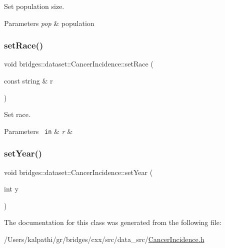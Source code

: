 Set population size. 


\begin{DoxyParams}{Parameters}
{\em pop} & population \\
\hline
\end{DoxyParams}
\mbox{\label{classbridges_1_1dataset_1_1_cancer_incidence_ac19844df029b7dc4595205e9660d53e2}} 
\subsubsection{\texorpdfstring{setRace()}{setRace()}}
{\footnotesize\ttfamily void bridges\+::dataset\+::\+Cancer\+Incidence\+::set\+Race (\begin{DoxyParamCaption}\item[{const string \&}]{r }\end{DoxyParamCaption})\hspace{0.3cm}{\ttfamily [inline]}}



Set race. 


\begin{DoxyParams}[1]{Parameters}
\mbox{\texttt{ in}}  & {\em r} & \\
\hline
\end{DoxyParams}
\mbox{\label{classbridges_1_1dataset_1_1_cancer_incidence_a833ce8f785d61a5271a2ef949ed76680}} 
\subsubsection{\texorpdfstring{setYear()}{setYear()}}
{\footnotesize\ttfamily void bridges\+::dataset\+::\+Cancer\+Incidence\+::set\+Year (\begin{DoxyParamCaption}\item[{int}]{y }\end{DoxyParamCaption})\hspace{0.3cm}{\ttfamily [inline]}}



The documentation for this class was generated from the following file\+:\begin{DoxyCompactItemize}
\item 
/\+Users/kalpathi/gr/bridges/cxx/src/data\+\_\+src/\mbox{\hyperlink{_cancer_incidence_8h}{Cancer\+Incidence.\+h}}\end{DoxyCompactItemize}

